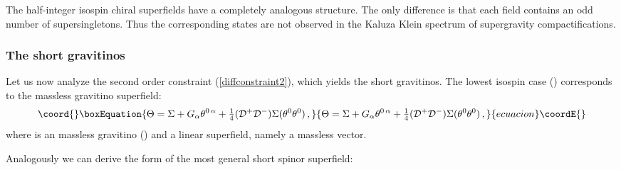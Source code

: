 \documentclass[a4paper,12pt]{article}
\providecommand{\ft}[2]{{\textstyle\frac{#1}{#2}}}
\begin{document}
The half-integer isospin chiral superfields have a completely
analogous structure.
The only difference is that each field contains an odd number of
\coordHE{} supersingletons.
Thus the corresponding states are not observed in the Kaluza Klein
spectrum of supergravity compactifications.
\subsubsection{The \coordHE{} short gravitinos}
Let us now analyze the second order constraint (\ref{diffconstraint2}),
which yields the \coordHE{} short gravitinos.
The lowest isospin case (\coordHE{}) corresponds to the massless gravitino
superfield:
\begin{equation}\coord{}\boxEquation{
\Theta=\Sigma+G_\alpha\theta^{0\,\alpha}+\ft{1}{4}({\cal D}^+
{\cal D}^-)\Sigma(\theta^0\theta^0)\,,
}{
\Theta=\Sigma+G_\alpha\theta^{0\,\alpha}+\ft{1}{4}({\cal D}^+
{\cal D}^-)\Sigma(\theta^0\theta^0)\,,
}{ecuacion}\coordE{}\end{equation}
where \coordHE{} is an \coordHE{} massless gravitino
(\coordHE{}) and \myHighlight{$\Sigma$}\coordHE{} a linear superfield,
namely a massless vector.
\par
Analogously we can derive the form of the most general
\coordHE{} short spinor superfield:
\end{document}
